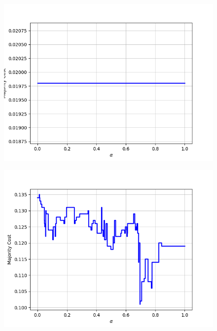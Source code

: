 \begin{figure}[h]
\begin{minipage}{.24\textwidth}
  {\includegraphics[width=\linewidth]{plots/nell-ac/invertebrate}}
\end{minipage}
\begin{minipage}{.24\textwidth}
  \centering
  {\includegraphics[width=\linewidth]{plots/nell-ac/location}}
\end{minipage}
\begin{minipage}{.24\textwidth}
  \centering

\end{minipage}
\end{figure}
